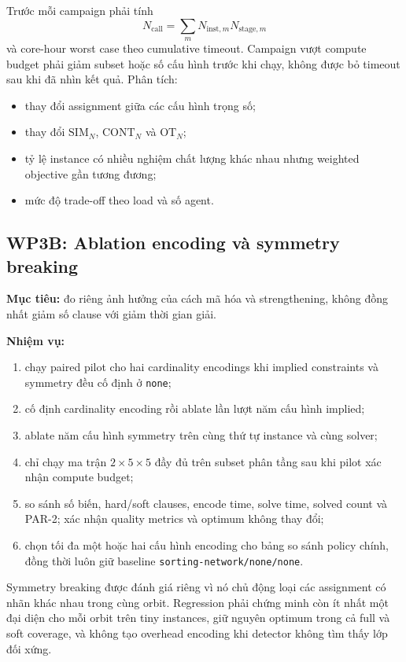 \documentclass[12pt,a4paper]{article}
\newcommand{\SIM}{\mathrm{SIM}}
\newcommand{\CONT}{\mathrm{CONT}}
\newcommand{\OT}{\mathrm{OT}}
\begin{document}
Trước mỗi campaign phải tính
\begin{equation}
  N_{\mathrm{call}}=\sum_m N_{\mathrm{inst},m}
                       N_{\mathrm{stage},m}
\end{equation}
và core-hour worst case theo cumulative timeout. Campaign vượt compute budget
phải giảm subset hoặc số cấu hình trước khi chạy, không được bỏ timeout sau khi
đã nhìn kết quả. Phân tích:
\begin{itemize}
  \item thay đổi assignment giữa các cấu hình trọng số;
  \item thay đổi $\SIM_N$, $\CONT_N$ và $\OT_N$;
  \item tỷ lệ instance có nhiều nghiệm chất lượng khác nhau nhưng weighted
        objective gần tương đương;
  \item mức độ trade-off theo load và số agent.
\end{itemize}

\subsection{WP3B: Ablation encoding và symmetry breaking}

\textbf{Mục tiêu:} đo riêng ảnh hưởng của cách mã hóa và strengthening, không
đồng nhất giảm số clause với giảm thời gian giải.

\textbf{Nhiệm vụ:}
\begin{enumerate}
  \item chạy paired pilot cho hai cardinality encodings khi implied constraints
        và symmetry đều cố định ở \texttt{none};
  \item cố định cardinality encoding rồi ablate lần lượt năm cấu hình implied;
  \item ablate năm cấu hình symmetry trên cùng thứ tự instance và cùng solver;
  \item chỉ chạy ma trận $2\times5\times5$ đầy đủ trên subset phân tầng sau khi
        pilot xác nhận compute budget;
  \item so sánh số biến, hard/soft clauses, encode time, solve time, solved count
        và PAR-2; xác nhận quality metrics và optimum không thay đổi;
  \item chọn tối đa một hoặc hai cấu hình encoding cho bảng so sánh policy chính,
        đồng thời luôn giữ baseline \texttt{sorting-network/none/none}.
\end{enumerate}

Symmetry breaking được đánh giá riêng vì nó chủ động loại các assignment có
nhãn khác nhau trong cùng orbit. Regression phải chứng minh còn ít nhất một đại
diện cho mỗi orbit trên tiny instances, giữ nguyên optimum trong cả full và soft
coverage, và không tạo overhead encoding khi detector không tìm thấy lớp đối xứng.
\end{document}
